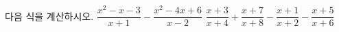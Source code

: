 다음 식을 계산하시오.
 $\dfrac{x^2-x-3}{x+1}-\dfrac{x^2-4x+6}{x-2}$
 $\dfrac{x+3}{x+4}+\dfrac{x+7}{x+8}-\dfrac{x+1}{x+2}-\dfrac{x+5}{x+6}$
